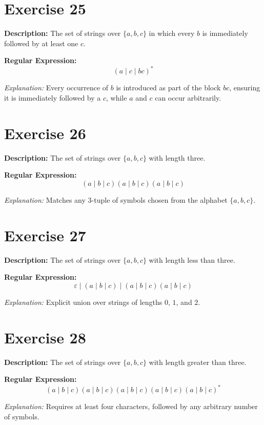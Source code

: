 \documentclass[12pt]{article}
\newcommand{\exercisedescription}[1]{%
    \Needspace{4\baselineskip}%
    \noindent\textbf{Description:} #1\par
    \vspace{0.25cm}
}
\newcommand{\reexpression}[1]{%
    \noindent\textbf{Regular Expression:}
    \vspace{-0.25cm}
    \begin{equation*}
        #1
    \end{equation*}
    \vspace{-0.15cm}
}
\newcommand{\reexplanation}[1]{%
    \noindent\textit{Explanation:} #1\par
    \vspace{0.55cm}
}
\begin{document}

\section*{Exercise 25}
\exercisedescription{%
    The set of strings over $\{a,b,c\}$ in which every $b$ is immediately followed by at least one $c$.
}
\reexpression{%
    (a \mid c \mid bc)^*
}
\reexplanation{%
    Every occurrence of $b$ is introduced as part of the block $bc$, ensuring it is immediately followed by a $c$, while $a$ and $c$ can occur arbitrarily.
}


\section*{Exercise 26}
\exercisedescription{%
    The set of strings over $\{a,b,c\}$ with length three.
}
\reexpression{%
    (a \mid b \mid c)(a \mid b \mid c)(a \mid b \mid c)
}
\reexplanation{%
    Matches any 3-tuple of symbols chosen from the alphabet $\{a, b, c\}$.
}


\section*{Exercise 27}
\exercisedescription{%
    The set of strings over $\{a,b,c\}$ with length less than three.
}
\reexpression{%
    \varepsilon \mid (a \mid b \mid c) \mid (a \mid b \mid c)(a \mid b \mid c)
}
\reexplanation{%
    Explicit union over strings of lengths $0$, $1$, and $2$.
}
\newpage


\section*{Exercise 28}
\exercisedescription{%
    The set of strings over $\{a,b,c\}$ with length greater than three.
}
\reexpression{%
    (a \mid b \mid c)(a \mid b \mid c)(a \mid b \mid c)(a \mid b \mid c)(a \mid b \mid c)^*
}
\reexplanation{%
    Requires at least four characters, followed by any arbitrary number of symbols.
}
\end{document}
